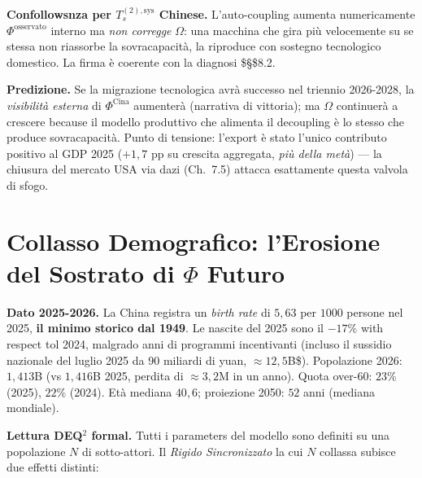 \Proved{} \textbf{Confollowsnza per \(T_s^{(2),\text{sys}}\) Chinese.}
L'auto-coupling aumenta numericamente \(\Phi^{\text{osservato}}\)
interno ma \emph{non corregge} \(\Omega\): una macchina che gira più
velocemente su se stessa non riassorbe la sovracapacità, la riproduce
con sostegno tecnologico domestico. La firma è coerente con la diagnosi
\$\S\$8.2.

\Conj{} \textbf{Predizione.} Se la migrazione tecnologica avrà successo
nel triennio 2026-2028, la \emph{visibilità esterna} di
\(\Phi^{\text{Cina}}\) aumenterà (narrativa di vittoria); ma \(\Omega\)
continuerà a crescere because il modello produttivo che alimenta il
decoupling è lo stesso che produce sovracapacità. Punto di tensione:
l'export è stato l'unico contributo positivo al GDP 2025 (\(+1{,}7\) pp
su crescita aggregata, \emph{più della metà}) --- la chiusura del
mercato USA via dazi (Ch.~7.5) attacca esattamente questa valvola di
sfogo.



\section{\texorpdfstring{Collasso Demografico: l'Erosione del Sostrato
di \(\Phi\)
Futuro}{Collasso Demografico: l'Erosione del Sostrato di \textbackslash Phi Futuro}}\label{collapse-demografico-lerosione-del-sostrato-di-phi-futuro}

\Proved{} \textbf{Dato 2025-2026.} La China registra un \emph{birth rate}
di \(5{,}63\) per \(1000\) persone nel 2025, \textbf{il minimo storico
dal 1949}. Le nascite del 2025 sono il \(-17\%\) with respect tol 2024,
malgrado anni di programmi incentivanti (incluso il sussidio nazionale
del luglio 2025 da 90 miliardi di yuan, \(\approx 12{,}5\)B\$).
Popolazione 2026: \(1{,}413\)B (vs \(1{,}416\)B 2025, perdita di
\(\approx 3{,}2\)M in un anno). Quota over-60: \(23\%\) (2025), \(22\%\)
(2024). Età mediana \(40{,}6\); proiezione 2050: \(52\) anni (mediana
mondiale).

\Hypoth{} \textbf{Lettura DEQ$^2$ formal.} Tutti i parameters del modello
sono definiti su una popolazione \(N\) di sotto-attori. Il \emph{Rigido
Sincronizzato} la cui \(N\) collassa subisce due effetti distinti:


